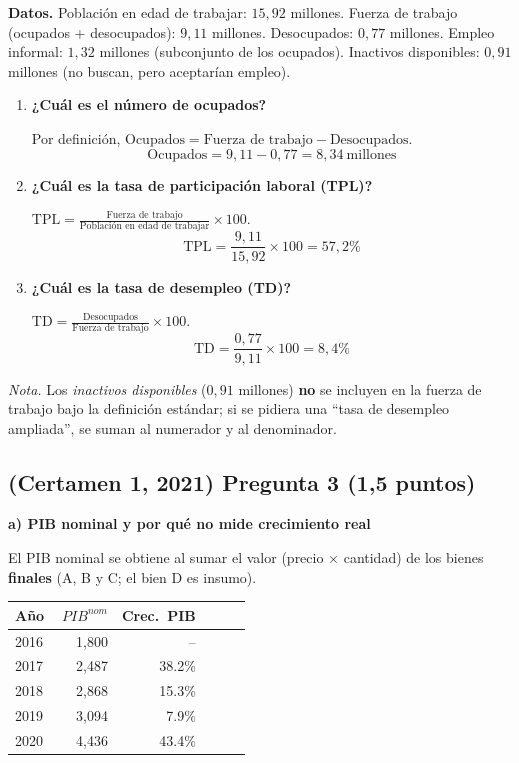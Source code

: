 \documentclass[11pt,addpoints]{article}
\begin{document}
\textbf{Datos.} Población en edad de trabajar: \(15{,}92\) millones. Fuerza de trabajo (ocupados + desocupados): \(9{,}11\) millones. Desocupados: \(0{,}77\) millones. Empleo informal: \(1{,}32\) millones (subconjunto de los ocupados). Inactivos disponibles: \(0{,}91\) millones (no buscan, pero aceptarían empleo).

\begin{enumerate}[label=\alph*)]

\item \textbf{¿Cuál es el número de ocupados?}

Por definición, \(\text{Ocupados} = \text{Fuerza de trabajo} - \text{Desocupados}\).
\[
\text{Ocupados} = 9{,}11 - 0{,}77 = \boxed{8{,}34\ \text{millones}}
\]

\item \textbf{¿Cuál es la tasa de participación laboral (TPL)?}

\(\displaystyle \text{TPL} = \frac{\text{Fuerza de trabajo}}{\text{Población en edad de trabajar}}\times 100\).
\[
\text{TPL} = \frac{9{,}11}{15{,}92}\times 100 = \boxed{57{,}2\%}
\]

\item \textbf{¿Cuál es la tasa de desempleo (TD)?}

\(\displaystyle \text{TD} = \frac{\text{Desocupados}}{\text{Fuerza de trabajo}}\times 100\).
\[
\text{TD} = \frac{0{,}77}{9{,}11}\times 100 = \boxed{8{,}4\%}
\]

\end{enumerate}

\textit{Nota.} Los \emph{inactivos disponibles} (\(0{,}91\) millones) \textbf{no} se incluyen en la fuerza de trabajo bajo la definición estándar; si se pidiera una “tasa de desempleo ampliada”, se suman al numerador y al denominador.


\newpage
\vspace*{0.1cm}

\subsection*{(Certamen 1, 2021) \quad Pregunta 3 (1,5 puntos)}

\textbf{a) PIB nominal y por qué no mide crecimiento real}

El PIB nominal se obtiene al sumar el valor (precio $\times$ cantidad) de los bienes \textbf{finales} (A, B y C; el bien D es insumo).

\begin{center}
\begin{tabular}{lrrrrr}
\toprule
\textbf{Año} & \textbf{$\;PIB^{nom}$} & \textbf{Crec.\ PIB} \\
\midrule
2016 & 1{,}800 & -- \\
2017 & 2{,}487 & 38.2\% \\
2018 & 2{,}868 & 15.3\% \\
2019 & 3{,}094 & 7.9\% \\
2020 & 4{,}436 & 43.4\% \\
\bottomrule
\end{tabular}
\end{center}
\end{document}
